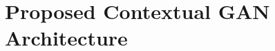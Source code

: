 \documentclass{article}
\begin{document}



\section{Proposed Contextual GAN Architecture}
\end{document}
